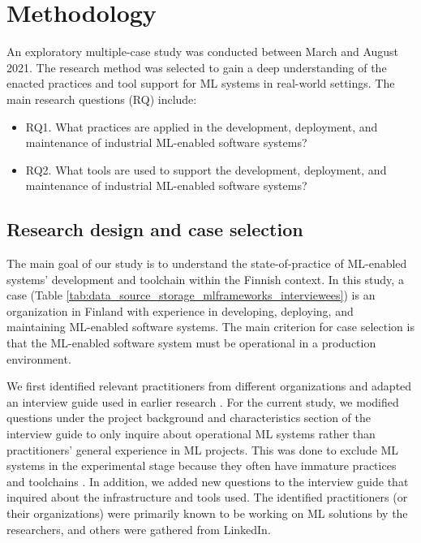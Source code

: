 \documentclass{IEEEcsmag}
\begin{document}
\section{\textbf{Methodology}}
\label{sec: methodology}

An exploratory multiple-case study \cite{Runeson2008} was conducted between March and August 2021. The research method was selected to gain a deep understanding of the enacted practices and tool support for ML systems in real-world settings. The main research questions (RQ) include:
\begin{itemize}
    \item RQ1. What practices are applied in the development, deployment, and maintenance of industrial ML-enabled software systems?
    \item RQ2. What tools are used to support the development, deployment, and maintenance of industrial ML-enabled software systems?
\end{itemize}

\subsection{Research design and case selection}
The main goal of our study is to understand the state-of-practice of ML-enabled systems' development and toolchain within the Finnish context. In this study, a case (Table  \ref{tab:data_source_storage_mlframeworks_interviewees}) is an organization in Finland with experience in developing, deploying, and maintaining ML-enabled software systems. The main criterion for case selection is that the ML-enabled software system must be operational in a production environment.

We first identified relevant practitioners from different organizations and adapted an interview guide used in earlier research \cite{Lwakatare2019}. For the current study, we modified questions under the project background and characteristics section of the interview guide to only inquire about operational ML systems rather than practitioners' general experience in ML projects. This was done to exclude ML systems in the experimental stage because they often have immature practices and toolchains \cite{Lwakatare2019}. In addition, we added new questions to the interview guide that inquired about the infrastructure and tools used. The identified practitioners (or their organizations) were primarily known to be working on ML solutions by the researchers, and others were gathered from LinkedIn.
\end{document}
